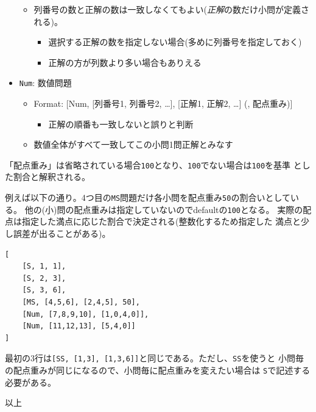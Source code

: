 \begin{itemize}
\begin{itemize}
\begin{itemize}
\end{itemize}

\item 列番号の数と正解の数は一致しなくてもよい(\emph{正解}の数だけ小問が定義される)。

\begin{itemize}
\item 選択する正解の数を指定しない場合(多めに列番号を指定しておく)

\item 正解の方が列数より多い場合もありえる

\end{itemize}

\end{itemize}

\item \texttt{Num}: 数値問題

\begin{itemize}
\item Format: {[Num, {[列番号1, 列番号2, {\ldots}]}, {[正解1, 正解2, {\ldots}]} (, 配点重み)]}

\begin{itemize}
\item 正解の順番も一致しないと誤りと判断

\end{itemize}

\item 数値全体がすべて一致してこの小問1問正解とみなす

\end{itemize}

\end{itemize}
「配点重み」は省略されている場合\texttt{100}となり、\texttt{100}でない場合は\texttt{100}を基準
とした割合と解釈される。

例えば以下の通り。4つ目の\texttt{MS}問題だけ各小問を配点重み\texttt{50}の割合いとしている。
他の(小)問の配点重みは指定していないのでdefaultの\texttt{100}となる。
実際の配点は指定した満点に応じた割合で決定される(整数化するため指定した
満点と少し誤差が出ることがある)。
\begin{tcolorbox}[enhanced jigsaw,breakable,colframe=\mycolor ,colback=white,colbacktitle=\mycolor ,coltitle=white,fonttitle=\bfseries\sffamily,title=正解定義ファイルの例]

\begin{verbatim}
[
    [S, 1, 1],
    [S, 2, 3],
    [S, 3, 6],
    [MS, [4,5,6], [2,4,5], 50],
    [Num, [7,8,9,10], [1,0,4,0]],
    [Num, [11,12,13], [5,4,0]]
]
\end{verbatim}

\end{tcolorbox}
最初の3行は\texttt{[SS, [1,3], [1,3,6]]}と同じである。ただし、\texttt{SS}を使うと
小問毎の配点重みが同じになるので、小問毎に配点重みを変えたい場合は
\texttt{S}で記述する必要がある。

\hfill  以上


